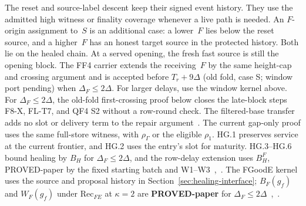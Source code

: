\documentclass{article}
\theoremstyle{plain}
\theoremstyle{definition}
\theoremstyle{remark}
\begin{document}
The reset and source-label descent keep their signed event history.
They use the admitted high witness or finality coverage whenever a
live path is needed.  An $F$-origin assignment to~$S$ is an additional
case: a lower~$F$ lies below the reset source, and a higher~$F$ has an
honest target source in the protected history.  Both lie on the healed
chain.  At a served opening, the fresh fast source is still the opening
block.  The FF4 carrier extends the receiving~$F$ by the same height-cap
and crossing argument and is accepted before $T_r+9\Delta$ (old fold, case S; window port pending) when
$\Delta_F\leq2\Delta$.  For larger delays, use the window kernel above.
For $\Delta_F\leq2\Delta$, the old-fold first-crossing proof below closes the late-block steps F8-X, FL-T7,
and QF4 S2 without a row-round check.
The filtered-base transfer adds no slot or delivery term to
the repair argument~\cite[\S6.4]{FB}.  The current gap-only proof
uses the same full-store witness, with $\rho_\Gamma$ or the eligible
$\rho_1$.  HG.1 preserves service at the current frontier, and
HG.2 uses the entry's slot for maturity.  HG.3--HG.6 bound healing
by $B_H$ for $\Delta_F\leq2\Delta$, and the row-delay extension uses
$B_H^F$, PROVED-paper by the fixed starting batch and W1--W3~\cite[H.6--H.6-C, HG.1--HG.6, H.20]{BPH},~\cite[\S3]{RD}.
The FGoodE kernel uses the source and proposal history in
Section~\ref{sec:healing-interface}; $B_F(g_f)$ and $W_F(g_f)$ under
$\mathrm{Rec}_{FE}$ at $\kappa=2$ are \textbf{PROVED-paper}
for $\Delta_F\leq2\Delta$~\cite[H.20--H.22]{BPH},~\cite[F1--F9, FF5]{BPF}.
\end{document}
